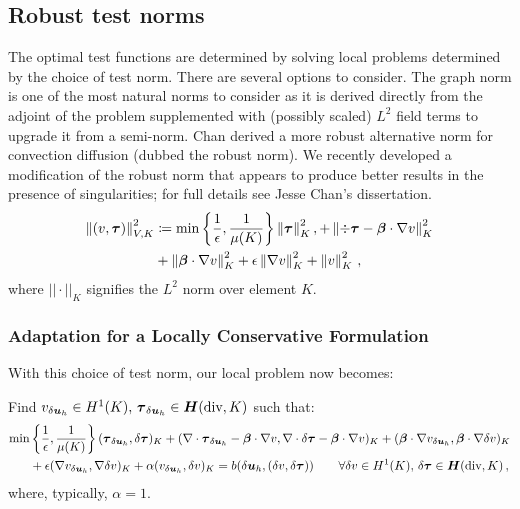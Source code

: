 \documentclass[Proposal.tex]{subfiles}
\begin{document}
\subsection{Robust test norms}
\label{sec:robustNorms}
The optimal test functions are determined by solving local problems determined
by the choice of test norm. There are several options to consider.
The graph norm \cite{DPGOverview} is one of the most natural norms to consider
as it is derived directly from the adjoint of the problem supplemented with
(possibly scaled) $L^2$ field terms to upgrade it from a semi-norm.
Chan \etal\cite{ChanHeuerThanhDemkowicz2012} derived a more robust alternative
norm for convection diffusion (dubbed the robust norm). We recently
developed a modification of the robust norm that appears to produce better
results in the presence of singularities; 
for full details see Jesse Chan's dissertation\cite{JesseDissertation}.
\begin{align}
\left\| \left( v,\boldsymbol\tau \right) \right\|_{V,K}^2 &\coloneqq
\min\left\{\frac{1}{\epsilon},\frac{1}{\mu(K)}\right\}\left\| \boldsymbol\tau \right\|_K^2,
+ \left\| \div \boldsymbol\tau - \boldsymbol\beta\cdot\nabla v \right\|_K^2 \\
&+\left\| \boldsymbol\beta\cdot \nabla v \right\|_K^2
+ \epsilon\left\| \nabla v \right\|_K^2
+ \left\| v \right\|^2_K\,,
\end{align}
where $||\cdot||_K$ signifies the $L^2$ norm over element $K$.\

\subsubsection{Adaptation for a Locally Conservative Formulation}
With this choice of test norm, our local problem now becomes:

Find $v_{\delta\boldsymbol{u}_h}\in H^{1}(K),\,\boldsymbol\tau_{\delta\boldsymbol{u}_h}\in\mbox{\boldmath $H$}(\text{div},K)$ such that:
\begin{align}
\min&\left\{\frac{1}{\epsilon},\frac{1}{\mu(K)}\right\}(\boldsymbol\tau_{\delta\boldsymbol{u}_h},\delta\boldsymbol\tau)_K
+(\nabla\cdot\boldsymbol\tau_{\delta\boldsymbol{u}_h}-\boldsymbol\beta\cdot\nabla
v,\nabla\cdot\delta\boldsymbol\tau-\boldsymbol\beta\cdot\nabla v)_K
+(\boldsymbol\beta\cdot\nabla v_{\delta\boldsymbol{u}_h},\boldsymbol\beta\cdot\nabla \delta v)_K\nonumber\\
&+\epsilon(\nabla v_{\delta\boldsymbol{u}_h},\nabla \delta v)_K
+\alpha(v_{\delta\boldsymbol{u}_h},\delta v)_K
=b(\delta\boldsymbol{u}_h,(\delta v,\delta\boldsymbol\tau))
\quad\quad\forall\delta v\in H^{1}(K),\,\delta\boldsymbol\tau\in\mbox{\boldmath $H$}(\text{div},K)\,,
\label{eq:localSolve}
\end{align}
where, typically, $\alpha=1$.
\end{document}
